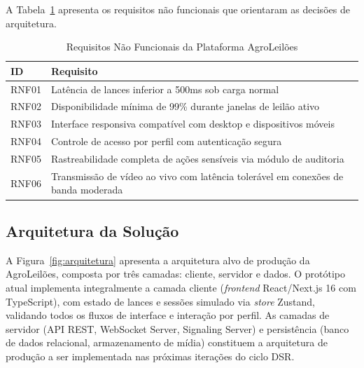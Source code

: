 \documentclass[12pt]{article}
\begin{document}
A Tabela~\ref{tab:rnf} apresenta os requisitos não funcionais que orientaram as
decisões de arquitetura.

\begin{table}[h]
\centering
\caption{Requisitos Não Funcionais da Plataforma AgroLeilões}
\label{tab:rnf}
\begin{tabularx}{\columnwidth}{lX}
\toprule
\textbf{ID} & \textbf{Requisito} \\
\midrule
RNF01 & Latência de lances inferior a 500ms sob carga normal \\
RNF02 & Disponibilidade mínima de 99\% durante janelas de leilão ativo \\
RNF03 & Interface responsiva compatível com desktop e dispositivos móveis \\
RNF04 & Controle de acesso por perfil com autenticação segura \\
RNF05 & Rastreabilidade completa de ações sensíveis via módulo de auditoria \\
RNF06 & Transmissão de vídeo ao vivo com latência tolerável em conexões de banda moderada \\
\bottomrule
\end{tabularx}
\end{table}

\subsection{Arquitetura da Solução}

A Figura~\ref{fig:arquitetura} apresenta a arquitetura alvo de produção da AgroLeilões,
composta por três camadas: cliente, servidor e dados. O protótipo atual implementa
integralmente a camada cliente (\textit{frontend} React/Next.js 16 com TypeScript), com
estado de lances e sessões simulado via \textit{store} Zustand, validando todos os
fluxos de interface e interação por perfil. As camadas de servidor (API REST, WebSocket
Server, Signaling Server) e persistência (banco de dados relacional, armazenamento de
mídia) constituem a arquitetura de produção a ser implementada nas próximas iterações
do ciclo DSR.
\end{document}
